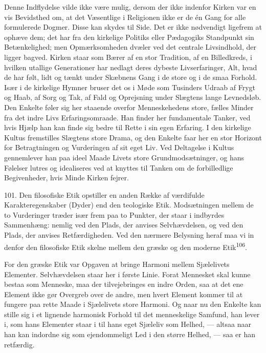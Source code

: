 \documentclass[12pt,a4paper,openany]{book}
\newcommand{\opage}[1]{\marginnote{\footnotesize\textit{[#1]}}}
\begin{document}
Denne Indflydelse vilde ikke være mulig, dersom der ikke indenfor Kirken
var en vis Bevidsthed om, at det Væsentlige i Religionen ikke er de én
Gang for alle formulerede Dogmer. Disse kan skydes til Side. Det er ikke
nødvendigt ligefrem at ophæve dem; det har fra den kirkelige Politiks
eller Pædagogiks Standpunkt sin Betænkelighed; men Opmærksomheden dvæler
ved det centrale Livsindhold, der ligger bagved. Kirken staar som Bærer
af en stor Tradition, af en Billedkreds, i hvilken utallige Generationer
har nedlagt deres dybeste Livserfaringer, Alt, hvad de har følt, lidt og
tænkt under Skæbnens Gang i de store og i de smaa Forhold. Især i de
kirkelige Hymner bruser det os i Møde som Tusinders Udraab af Frygt og
Haab, af Sorg og Tak, af Fald og Oprejsning under Slægtens lange
Levnedsløb. Den Enkelte føler sig her staaende overfor Menneskehedens
store, fælles Minder fra det indre Livs Erfaringsomraade. Han finder her
fundamentale Tanker, ved hvis Hjælp han kan finde sig bedre til Rette i
sin egen Erfaring. I den kirkelige Kultus fremstilles Slægtens store
Drama, og den Enkelte faar her en stor Horizont for Betragtningen og
Vurderingen af sit eget Liv. Ved Deltagelse i Kultus gennemlever han paa
ideel Maade Livets store Grundmodsætninger, og hans Følelser lutres og
idealiseres ved at knyttes til Tanken om de forbilledlige Begivenheder,
hvis Minde Kirken fejrer.

101. Den filosofiske Etik opstiller en anden Række af værdifulde
Karakteregenskaber (Dyder) end den teologiske Etik. Modsætningen mellem
de to Vurderinger træder især frem paa to Punkter, der staar i indbyrdes
Sammenhæng: nemlig ved den Plads, der anvises Selvhævdelsen, og ved den
Plads, der anvises Retfærdigheden. Ved den nærmere Belysning heraf maa
vi in%
\opage{227}denfor den filosofiske Etik skelne mellem den græske og den
moderne Etik\textsuperscript{106}.

For den græske Etik var Opgaven at bringe Harmoni mellem Sjælelivets
Elementer. Selvhævdelsen staar her i første Linie. Forat Mennesket skal
kunne bestaa som Menneske, maa der tilvejebringes en indre Orden, saa at
det ene Element ikke gør Overgreb over de andre, men hvert Element
kommer til at fungere paa rette Maade i Sjælelivets store Harmoni. Og
naar nu den Enkelte kan stille sig i et lignende harmonisk Forhold til
det menneskelige Samfund, han lever i, som hans Elementer staar i til
hans eget Sjæleliv som Helhed, --- altsaa naar han kan indordne sig som
ejendommeligt Led i den større Helhed, --- saa er han retfærdig.
\end{document}

